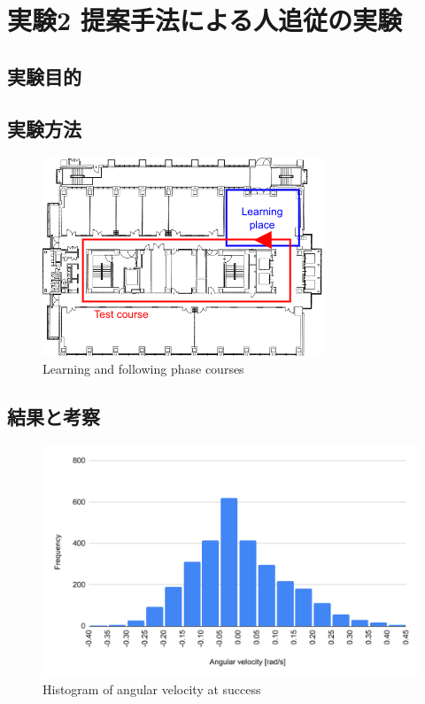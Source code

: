 \section{実験2 提案手法による人追従の実験}

\subsection{実験目的}
\subsection{実験方法}

  \begin{figure}[h]
    \centering
    \includegraphics[keepaspectratio, scale=0.80] {images/RobotGuidance_course.png}
    \captionsetup{justification=raggedright} %
    \caption{Learning and following phase courses}
    \label{Fig:RobotGuidance_course}
  \end{figure}

\subsection{結果と考察}

  \begin{figure}[h]
    \centering
    \includegraphics[keepaspectratio, scale=0.60] {images/RobotGuidance_success_histogram.png}
    \captionsetup{justification=raggedright} %
    \caption{Histogram of angular velocity at success}
    \label{Fig:RobotGuidance_success_histogram}
  \end{figure}

